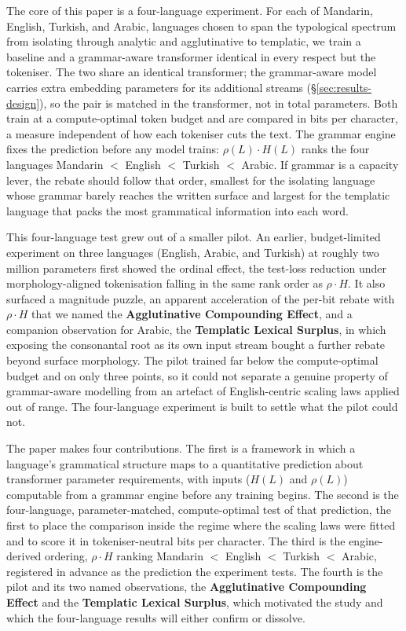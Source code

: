 The core of this paper is a four-language experiment. For each of Mandarin, English, Turkish, and Arabic, languages chosen to span the typological spectrum from isolating through analytic and agglutinative to templatic, we train a baseline and a grammar-aware transformer identical in every respect but the tokeniser. The two share an identical transformer; the grammar-aware model carries extra embedding parameters for its additional streams (\S\ref{sec:results-design}), so the pair is matched in the transformer, not in total parameters. Both train at a compute-optimal token budget and are compared in bits per character, a measure independent of how each tokeniser cuts the text. The grammar engine fixes the prediction before any model trains: $\rho(L) \cdot H(L)$ ranks the four languages Mandarin $<$ English $<$ Turkish $<$ Arabic. If grammar is a capacity lever, the rebate should follow that order, smallest for the isolating language whose grammar barely reaches the written surface and largest for the templatic language that packs the most grammatical information into each word.

This four-language test grew out of a smaller pilot. An earlier, budget-limited experiment on three languages (English, Arabic, and Turkish) at roughly two million parameters first showed the ordinal effect, the test-loss reduction under morphology-aligned tokenisation falling in the same rank order as $\rho \cdot H$. It also surfaced a magnitude puzzle, an apparent acceleration of the per-bit rebate with $\rho \cdot H$ that we named the \textbf{Agglutinative Compounding Effect}, and a companion observation for Arabic, the \textbf{Templatic Lexical Surplus}, in which exposing the consonantal root as its own input stream bought a further rebate beyond surface morphology. The pilot trained far below the compute-optimal budget and on only three points, so it could not separate a genuine property of grammar-aware modelling from an artefact of English-centric scaling laws applied out of range. The four-language experiment is built to settle what the pilot could not.

The paper makes four contributions. The first is a framework in which a language's grammatical structure maps to a quantitative prediction about transformer parameter requirements, with inputs ($H(L)$ and $\rho(L)$) computable from a grammar engine before any training begins. The second is the four-language, parameter-matched, compute-optimal test of that prediction, the first to place the comparison inside the regime where the scaling laws were fitted and to score it in tokeniser-neutral bits per character. The third is the engine-derived ordering, $\rho \cdot H$ ranking Mandarin $<$ English $<$ Turkish $<$ Arabic, registered in advance as the prediction the experiment tests. The fourth is the pilot and its two named observations, the \textbf{Agglutinative Compounding Effect} and the \textbf{Templatic Lexical Surplus}, which motivated the study and which the four-language results will either confirm or dissolve.

